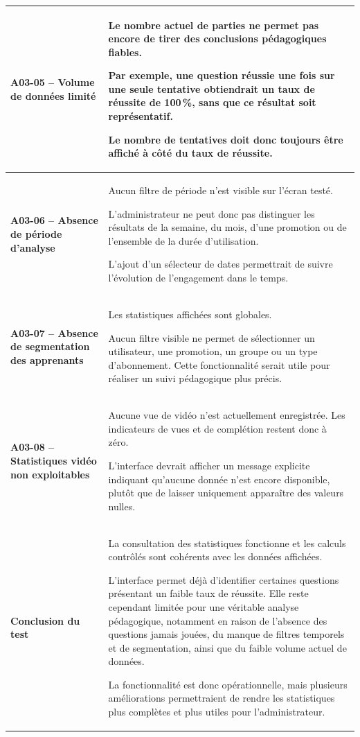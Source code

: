 \begin{longtable}{
    |>{\raggedright\arraybackslash}p{}
    |>{\raggedright\arraybackslash}p{}|
}
\textbf{A03-05 -- Volume de données limité}
&
Le nombre actuel de parties ne permet pas encore de tirer des conclusions
pédagogiques fiables.

Par exemple, une question réussie une fois sur une seule tentative
obtiendrait un taux de réussite de 100\,\%, sans que ce résultat soit
représentatif.

Le nombre de tentatives doit donc toujours être affiché à côté du taux de
réussite.
\\
\hline

\textbf{A03-06 -- Absence de période d'analyse}
&
Aucun filtre de période n'est visible sur l'écran testé.

L'administrateur ne peut donc pas distinguer les résultats de la semaine,
du mois, d'une promotion ou de l'ensemble de la durée d'utilisation.

L'ajout d'un sélecteur de dates permettrait de suivre l'évolution de
l'engagement dans le temps.
\\
\hline

\textbf{A03-07 -- Absence de segmentation des apprenants}
&
Les statistiques affichées sont globales.

Aucun filtre visible ne permet de sélectionner un utilisateur, une
promotion, un groupe ou un type d'abonnement. Cette fonctionnalité serait
utile pour réaliser un suivi pédagogique plus précis.
\\
\hline

\textbf{A03-08 -- Statistiques vidéo non exploitables}
&
Aucune vue de vidéo n'est actuellement enregistrée. Les indicateurs de vues
et de complétion restent donc à zéro.

L'interface devrait afficher un message explicite indiquant qu'aucune donnée
n'est encore disponible, plutôt que de laisser uniquement apparaître des
valeurs nulles.
\\
\hline

\textbf{Conclusion du test}
&
La consultation des statistiques fonctionne et les calculs contrôlés sont
cohérents avec les données affichées.

L'interface permet déjà d'identifier certaines questions présentant un
faible taux de réussite. Elle reste cependant limitée pour une véritable
analyse pédagogique, notamment en raison de l'absence des questions jamais
jouées, du manque de filtres temporels et de segmentation, ainsi que du
faible volume actuel de données.

La fonctionnalité est donc opérationnelle, mais plusieurs améliorations
permettraient de rendre les statistiques plus complètes et plus utiles pour
l'administrateur.
\\
\hline

\end{longtable}

\endgroup